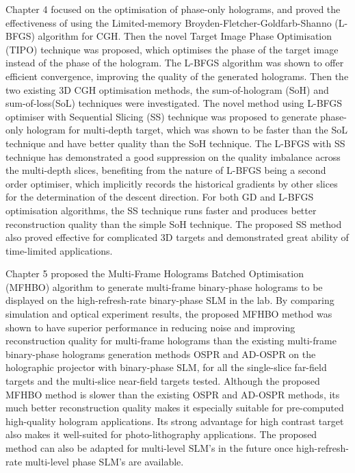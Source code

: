 Chapter 4 focused on the optimisation of phase-only holograms, and proved the effectiveness of using the Limited-memory Broyden-Fletcher-Goldfarb-Shanno (L-BFGS) algorithm for CGH. Then the novel Target Image Phase Optimisation (TIPO) technique was proposed, which optimises the phase of the target image instead of the phase of the hologram. The L-BFGS algorithm was shown to offer efficient convergence, improving the quality of the generated holograms. Then the two existing 3D CGH optimisation methods, the sum-of-hologram (SoH) and sum-of-loss(SoL) techniques were investigated. The novel method using L-BFGS optimiser with Sequential Slicing (SS) technique was proposed to generate phase-only hologram for multi-depth target, which was shown to be faster than the SoL technique and have better quality than the SoH technique. The L-BFGS with SS technique has demonstrated a good suppression on the quality imbalance across the multi-depth slices, benefiting from the nature of L-BFGS being a second order optimiser, which implicitly records the historical gradients by other slices for the determination of the descent direction. For both GD and L-BFGS optimisation algorithms, the SS technique runs faster and produces better reconstruction quality than the simple SoH technique. The proposed SS method also proved effective for complicated 3D targets and demonstrated great ability of time-limited applications.

Chapter 5 proposed the Multi-Frame Holograms Batched Optimisation (MFHBO) algorithm to generate multi-frame binary-phase holograms to be displayed on the high-refresh-rate binary-phase SLM in the lab. By comparing simulation and optical experiment results, the proposed MFHBO method was shown to have superior performance in reducing noise and improving reconstruction quality for multi-frame holograms than the existing multi-frame binary-phase holograms generation methods OSPR and AD-OSPR on the holographic projector with binary-phase SLM, for all the single-slice far-field targets and the multi-slice near-field targets tested. Although the proposed MFHBO method is slower than the existing OSPR and AD-OSPR methods, its much better reconstruction quality makes it especially suitable for pre-computed high-quality hologram applications. Its strong advantage for high contrast target also makes it well-suited for photo-lithography applications. The proposed method can also be adapted for multi-level SLM's in the future once high-refresh-rate multi-level phase SLM's are available.

